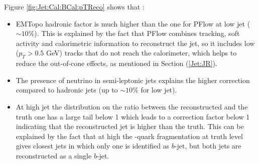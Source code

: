 Figure \ref{fig:Jet:Cal:BCal:pTReco} shows that :
\begin{itemize}
    \item EMTopo hadronic factor is much higher than the one for PFlow at low jet \pT ($\sim10\%$). This is explained by the fact that PFlow combines tracking, soft activity and calorimetric information to reconstruct the jet, so it includes low \pT ($p_T > 0.5$ GeV) tracks that do not reach the calorimeter, which helps to reduce the out-of-cone effects, as mentioned in Section (\ref{Jet:JR}). 
    \item The presence of neutrino in semi-leptonic jets explains the higher correction compared to hadronic jets (up to $\sim10\%$ for low \pT jet).
    \item At high jet \pT the distribution on the ratio between the reconstructed \pT and the truth one has a large tail below 1 which leads to a correction factor below 1 indicating that the reconstructed jet \pT is higher than the truth. This can be explained by the fact that at high \pT the \bq-quark fragmentation at truth level gives closest jets in which only one is identified as $b$-jet, but both jets are reconstructed as a single $b$-jet.

\end{itemize}
